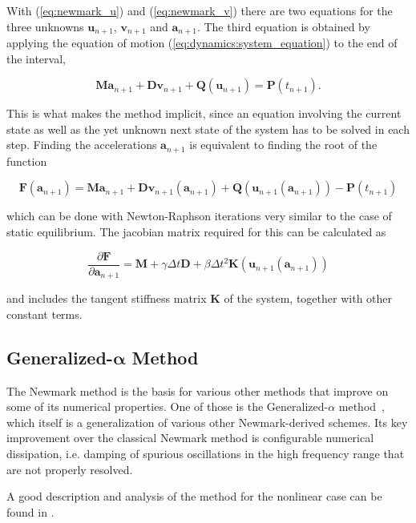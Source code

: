 With (\ref{eq:newmark_u}) and (\ref{eq:newmark_v}) there are two equations for the three unknowns $\boldsymbol{u}_{n+1}$, $\mathbf{v}_{n+1}$ and $\boldsymbol{a}_{n+1}$.
The third equation is obtained by applying the equation of motion (\ref{eq:dynamics:system_equation}) to the end of the interval,

\begin{equation}
\boldsymbol{M}\boldsymbol{a}_{n+1} + \boldsymbol{D}\mathbf{v}_{n+1} + \boldsymbol{Q}(\boldsymbol{u}_{n+1}) = \boldsymbol{P}(t_{n+1}). \label{eq:newmark_balance}
\end{equation}

This is what makes the method implicit, since an equation involving the current state as well as the yet unknown next state of the system has to be solved in each step.
Finding the accelerations $\boldsymbol{a}_{n+1}$ is equivalent to finding the root of the function

$$
\boldsymbol{F}(\boldsymbol{a}_{n+1}) = \boldsymbol{M}\boldsymbol{a}_{n+1} + \boldsymbol{D}\mathbf{v}_{n+1}(\boldsymbol{a}_{n+1}) + \boldsymbol{Q}(\boldsymbol{u}_{n+1}(\boldsymbol{a}_{n+1})) - \boldsymbol{P}(t_{n+1})
$$

which can be done with Newton-Raphson iterations very similar to the case of static equilibrium.
The jacobian matrix required for this can be calculated as

$$
\frac{\partial \boldsymbol{F}}{\partial \boldsymbol{a}_{n+1}} = \boldsymbol{M} + \gamma \Delta t \boldsymbol{D} + \beta \Delta t^2 \boldsymbol{K}(\boldsymbol{u}_{n+1}(\boldsymbol{a}_{n+1}))
$$

and includes the tangent stiffness matrix $\boldsymbol{K}$ of the system, together with other constant terms.


\subsection{Generalized-$\boldsymbol{\alpha}$ Method}

The Newmark method is the basis for various other methods that improve on some of its numerical properties.
One of those is the Generalized-$\alpha$ method~\cite{bib:chung1993}, which itself is a generalization of various other Newmark-derived schemes.
Its key improvement over the classical Newmark method is configurable numerical dissipation, i.e. damping of spurious oscillations in the high frequency range that are not properly resolved.

A good description and analysis of the method for the nonlinear case can be found in \cite{bib:erlicher2002}.

